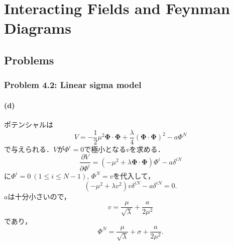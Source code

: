 \chapter{Interacting Fields and Feynman Diagrams}
\section*{Problems}
\subsection{Problem 4.2: Linear sigma model}
\subsubsection{(d)}
ポテンシャルは
\[ V = -\frac{1}{2} \mu^2 \boldsymbol\Phi \cdot \boldsymbol\Phi + \frac{\lambda}{4} (\boldsymbol\Phi \cdot \boldsymbol\Phi)^2 - a \Phi^N  \]
で与えられる．$V$が$\Phi^i = 0$で極小となる$v$を求める．
\[ \frac{\partial V}{\partial \Phi^i} = (-\mu^2 + \lambda \boldsymbol\Phi \cdot \boldsymbol\Phi) \Phi^i - a \delta^{iN} \]
に$\Phi^i = 0 ~ (1 \leq i \leq N-1)$, $\Phi^N = v$を代入して，
\[ (-\mu^2 + \lambda v^2) v \delta^{iN} - a \delta^{iN} = 0 .\]
$a$は十分小さいので，
\[ v = \frac{\mu}{\sqrt{\lambda}} + \frac{a}{2\mu^2} \]
であり，
\[ \Phi^N = \frac{\mu}{\sqrt{\lambda}} + \sigma + \frac{a}{2\mu^2} . \]

